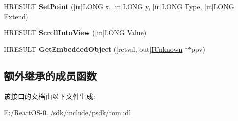 \begin{DoxyCompactItemize}
\item 
\mbox{\label{interface_i_text_range_a0cc9ef46c268487d8418e5f13fa32ee2}} 
H\+R\+E\+S\+U\+LT {\bfseries Set\+Point} (\mbox{[}in\mbox{]}L\+O\+NG x, \mbox{[}in\mbox{]}L\+O\+NG y, \mbox{[}in\mbox{]}L\+O\+NG Type, \mbox{[}in\mbox{]}L\+O\+NG Extend)
\item 
\mbox{\label{interface_i_text_range_ace89dc732cb4ee6bb5e8064bc350f436}} 
H\+R\+E\+S\+U\+LT {\bfseries Scroll\+Into\+View} (\mbox{[}in\mbox{]}L\+O\+NG Value)
\item 
\mbox{\label{interface_i_text_range_ab3eae49d64d19c2bcc49a6f63946655d}} 
H\+R\+E\+S\+U\+LT {\bfseries Get\+Embedded\+Object} (\mbox{[}retval, out\mbox{]}\hyperlink{interface_i_unknown}{I\+Unknown} $\ast$$\ast$ppv)
\end{DoxyCompactItemize}
\subsection*{额外继承的成员函数}


该接口的文档由以下文件生成\+:\begin{DoxyCompactItemize}
\item 
E\+:/\+React\+O\+S-\/0../sdk/include/psdk/tom.\+idl\end{DoxyCompactItemize}
